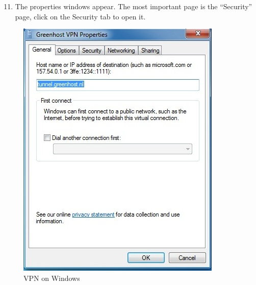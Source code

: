 \begin{enumerate}[1.]
\setcounter{enumi}{10}
\item
  The properties windows appear. The most important page is the
  ``Security'' page, click on the Security tab to open it.
\end{enumerate}
\begin{figure}[htbp]
\centering
\includegraphics{vpn_windows_10.jpg}
\caption{VPN on Windows}
\end{figure}

